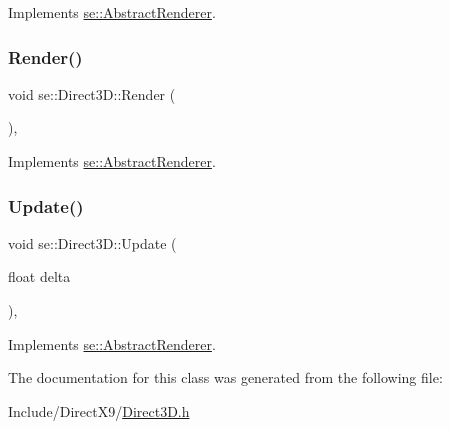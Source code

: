 Implements \mbox{\hyperlink{classse_1_1_abstract_renderer_a98e35b7db62827580573185ed91b25bb}{se\+::\+Abstract\+Renderer}}.

\mbox{\label{classse_1_1_direct3_d_af4e167f88160d79fc66b4d65694b536a}} 
\subsubsection{\texorpdfstring{Render()}{Render()}}
{\footnotesize\ttfamily void se\+::\+Direct3\+D\+::\+Render (\begin{DoxyParamCaption}{ }\end{DoxyParamCaption})\hspace{0.3cm}{\ttfamily [override]}, {\ttfamily [virtual]}}



Implements \mbox{\hyperlink{classse_1_1_abstract_renderer_a08f813c33edad06bf7d379f8257895e6}{se\+::\+Abstract\+Renderer}}.

\mbox{\label{classse_1_1_direct3_d_a39934c194406f108a992d82a4d265381}} 
\subsubsection{\texorpdfstring{Update()}{Update()}}
{\footnotesize\ttfamily void se\+::\+Direct3\+D\+::\+Update (\begin{DoxyParamCaption}\item[{float}]{delta }\end{DoxyParamCaption})\hspace{0.3cm}{\ttfamily [override]}, {\ttfamily [virtual]}}



Implements \mbox{\hyperlink{classse_1_1_abstract_renderer_aae49e7417663d6a5aca34a2bb37b4b28}{se\+::\+Abstract\+Renderer}}.



The documentation for this class was generated from the following file\+:\begin{DoxyCompactItemize}
\item 
Include/\+Direct\+X9/\mbox{\hyperlink{_direct3_d_8h}{Direct3\+D.\+h}}\end{DoxyCompactItemize}
